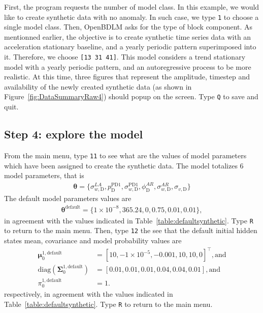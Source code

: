 First, the program requests the number of model class.
In this example, we would like to create synthetic data with no anomaly.
In such case, we type \colorbox{light-gray}{\lstinline[basicstyle = \mlttfamily \small, backgroundcolor = \color{light-gray}]!1!} to choose a single model class.
Then, OpenBDLM asks for the type of block component.
As mentionned earlier, the objective is to create synthetic time series data with an acceleration stationary baseline, and a yearly periodic pattern superimposed into it. 
Therefore, we choose \colorbox{light-gray}{\lstinline[basicstyle = \mlttfamily \small, backgroundcolor = \color{light-gray}]![13 31 41]!}.
This model considers a trend stationary model with a yearly periodic pattern, and an autoregressive process to be more realistic.
At this time, three figures  that represent the amplitude, timestep and availability of the newly created synthetic data (as shown in Figure~\ref{fig:DataSummaryRaw4}) should popup on the screen.
Type \colorbox{light-gray}{\lstinline[basicstyle = \mlttfamily \small, backgroundcolor = \color{light-gray}]!Q!} to save and quit.

\subsection{Step 4: explore the model}
From the main menu, type  \colorbox{light-gray}{\lstinline[basicstyle = \mlttfamily \small, backgroundcolor = \color{light-gray}]!11!} to see what are the values of model parameters which have been assigned to create the synthetic data.
The model totalizes 6 model parameters, that is 
\begin{gather*}
\bm\theta=\{\sigma_{w, \text{D}}^{LA}, p^{\text{PD1}}_{\text{D}}, \sigma_{w,\text{D}}^{\text{PD1}}, \phi^{AR}_{\text{D}}, \sigma_{w,\text{D}}^{AR}, \sigma_{v,\text{D}}\} 
 \end{gather*}
The default model parameters values are 
\begin{gather*}
\bm\theta^{\text{default}}=\{1\times10^{-8}, 365.24, 0, 0.75, 0.01, 0.01\}, 
\end{gather*}
in agreement with the values indicated in Table~\ref{table:defaultsynthetic}.
Type \colorbox{light-gray}{\lstinline[basicstyle = \mlttfamily \small, backgroundcolor = \color{light-gray}]!R!} to return to the main menu.
Then, type \colorbox{light-gray}{\lstinline[basicstyle = \mlttfamily \small, backgroundcolor = \color{light-gray}]!12!} the see that the default initial hidden states mean, covariance  and model probability values are 
\begin{align*}
 \bm \mu^{1,\text{default}}_{0} & = [	10  , -1\times10^{-5}  ,	-0.001	,	10  ,  	10    ,	0         ]^{\intercal}, \text{and} \\
 \text{diag}(\bm\Sigma^{1,\text{default}}_{0})  & = [	0.01  ,	0.01  ,	0.01  	,0.04  ,	0.04  ,	0.01     ], \text{and} \\
 \pi_{0}^{1,\text{default}} & = 1.
\end{align*}
respectively, in agreement with the values indicated in Table~\ref{table:defaultsynthetic}.
Type \colorbox{light-gray}{\lstinline[basicstyle = \mlttfamily \small, backgroundcolor = \color{light-gray}]!R!} to return to the main menu.

